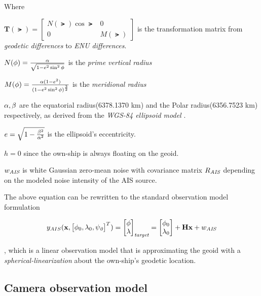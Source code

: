 Where

\begin{description}
	\item $\mathbf{T}(\lat)=
	\begin{bmatrix}
	N(\lat)\cos\lat &0\\
	0 &M(\lat)
	\end{bmatrix}
	$ is the transformation matrix from \emph{geodetic differences} to \emph{ENU differences}.
	\item $N({\phi}) = \frac{{\alpha}}{\sqrt{1-e^2\sin^2{\phi}}}$ is the \emph{prime vertical radius}
	\item $M({\phi}) = \frac{{\alpha}(1-e^2)}{(1-e^2\sin^2{\phi})^\frac{3}{2}}$ is the \emph{meridional radius}
	\item ${\alpha},{\beta}$ are the equatorial radius(6378.1370 km) and the Polar radius(6356.7523 km) respectively, as derived from the \emph{WGS-84 ellipsoid model} \cite{Farrell2008}.
	\item $e = \sqrt{1 -\frac{{\beta}^2}{{\alpha}^2}}$ is the ellipsoid's eccentricity.
	\item $h = 0 $ since the own-ship is always floating on the geoid.
	\item ${w}_{\textit{AIS}}$ is white Gaussian zero-mean noise with covariance matrix ${R}_{\textit{AIS}}$ depending on the modeled noise intensity of the AIS source.
\end{description}

The above equation can be rewritten to the standard observation model formulation

\begin{equation}
{{y}}_{AIS}(\mathbf{x},\begin{bmatrix}{\phi}_{0}, {\lambda}_{0}, {\psi}_{\textit{0}} \end{bmatrix}^{T}) = \begin{bmatrix}
{\phi}\\ {\lambda}
\end{bmatrix}_{\textit{target}} = \begin{bmatrix}
{\phi}_{0}\\ {\lambda}_{0}
\end{bmatrix} + \mathbf{H}\mathbf{x} + {w}_{\textit{AIS}}
\end{equation}

, which is a linear observation model that is approximating the geoid with a \emph{spherical-linearization} about the own-ship's geodetic location.

\subsection{Camera observation model}


